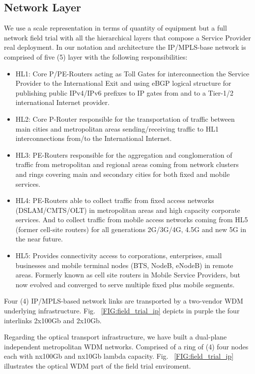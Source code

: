 \documentclass[a4paper,fleqn]{cas-dc}
\begin{document}
\subsection{Network Layer}
We use a scale representation in terms of quantity of equipment but a full network field trial with all the hierarchical layers that compose a Service Provider real deployment. In our notation and architecture the IP/MPLS-base network is comprised of five (5) layer with the following responsibilities: 
\begin{itemize}
    \item HL1: Core P/PE-Routers acting as Toll Gates for interconnection the Service Provider to the International Exit and using eBGP logical structure for publishing public IPv4/IPv6 prefixes to IP gates from and to a Tier-1/2 international Internet provider.
    \item HL2: Core P-Router responsible for the transportation of traffic between main cities and metropolitan areas sending/receiving traffic to HL1 interconnections from/to the International Internet.
    \item HL3: PE-Routers responsible for the aggregation and conglomeration of traffic from metropolitan and regional areas coming from network clusters and rings covering main and secondary cities for both fixed and mobile services.
    \item HL4: PE-Routers able to collect traffic from fixed access networks (DSLAM/CMTS/OLT) in metropolitan areas and high capacity corporate services. And to collect traffic from mobile access networks coming from HL5 (former cell-site routers) for all generations 2G/3G/4G, 4.5G and new 5G in the near future.
    \item HL5: Provides connectivity access to corporations, enterprises, small businesses and mobile terminal nodes (BTS, NodeB, eNodeB) in remote areas. Formerly known as cell site routers in Mobile Service Providers, but now evolved and converged to serve multiple fixed plus mobile segments.     
\end{itemize}

Four (4) IP/MPLS-based network links are transported by a two-vendor WDM underlying infrastructure. Fig. ~\ref{FIG:field_trial_ip} depicts in purple the four interlinks 2x100Gb and 2x10Gb.  

Regarding the optical transport infrastructure, we have built a dual-plane independent metropolitan WDM networks. Comprised of a ring of (4) four nodes each with nx100Gb and nx10Gb lambda capacity. Fig. ~\ref{FIG:field_trial_ip} illustrates the optical WDM part of the field trial enviroment.
\end{document}
